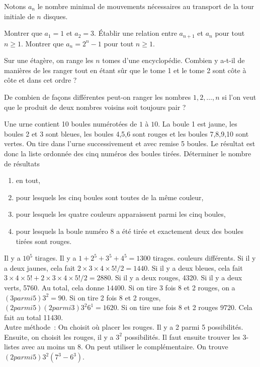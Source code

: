 \documentclass{magnolia}
\begin{document}
\bigskip
\noindent
Notons $a_n$ le nombre minimal de mouvements nécessaires au transport de
la tour initiale de $n$ disques.
\begin{questions}
\question Montrer que $a_1=1$ et $a_2=3$. 
\question Établir une relation entre $a_{n+1}$ et $a_n$ pour tout $n\ge 1$.
\question Montrer que $a_n=2^n-1$ pour tout $n\ge 1$. 
\end{questions}





Sur une étagère, on range les $n$ tomes d'une encyclopédie. Combien y a-t-il de manières de les ranger tout en étant sûr que le tome 1 et le tome 2 sont côte à côte et dans cet ordre ?


De combien de façons différentes peut-on ranger les nombres $1,2,\dots,n$ si l'on veut que le produit de deux nombres voisins soit toujours pair ?



Une urne contient 10 boules numérotées de $1$ à $10$. La boule 1 est jaune,
les boules 2 et 3 sont bleues, les boules 4,5,6 sont rouges et les boules 7,8,9,10
sont vertes. On tire dans l'urne successivement et avec remise 5 boules. Le résultat
est donc la liste ordonnée des cinq numéros des boules tirées. Déterminer le nombre de
résultats
\begin{enumerate}
\item en tout,
\item pour lesquels les cinq boules sont toutes de la même couleur,
\item pour lesquels les quatre couleurs apparaissent parmi les cinq boules,
\item pour lesquels la boule numéro 8 a été tirée et exactement deux des boules tirées sont rouges.
\end{enumerate}
\begin{sol}
\begin{questions}
\question Il y a $10^5$ tirages.
\question Il y a $1+2^5+3^5+4^5=1300$ tirages.
 couleurs différents. Si il y a deux jaunes, cela fait $2\times 3\times 4\times 5!/2=1440$.
  Si il y a deux bleues, cela fait $3\times 4\times 5!+2\times 3\times 4\times 5!/2=2880$.
  Si il y a deux rouges, 4320. Si il y a deux verts, 5760. Au total, cela donne $14400$.
\question Si on tire 3 fois 8 et 2 rouges, on a $(3 parmi 5)3^2=90$. Si on tire 2 fois 8 et 2 rouges,
  $(2 parmi 5)(2 parmi 3)3^2 6^1=1620$. Si on tire une fois 8 et 2 rouges $9720$.
  Cela fait au total 11430.\\
  Autre méthode~: On choisit où placer les rouges. Il y a 2 parmi 5 possibilités. Ensuite, on choisit
  les rouges, il y a $3^2$ possibilités. Il faut ensuite trouver les 3-listes avec au moins un 8. On peut
  utiliser le complémentaire. On trouve
  $(2 parmi 5) 3^2(7^3-6^3)$.
\end{questions}
\end{sol}
\end{document}
